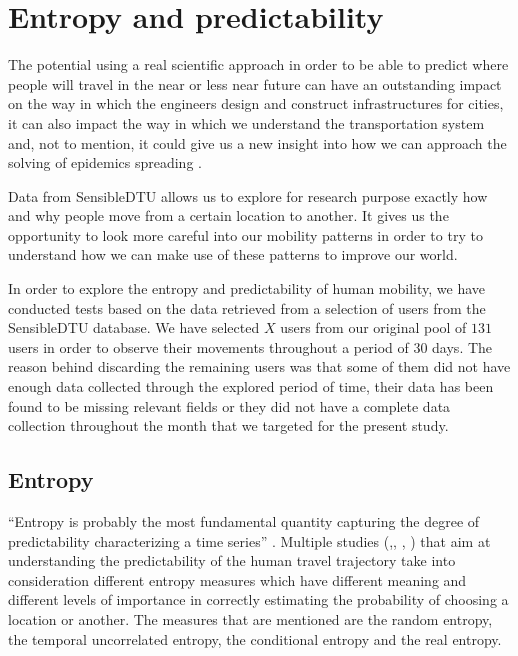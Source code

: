 \chapter{Entropy and predictability}

The potential using a real scientific approach in order to be able to predict
where people will travel in the near or less near future can have an outstanding
impact on the way in which the engineers design and construct infrastructures
for cities, it can also impact the way in which we understand the transportation
system and, not to mention, it could give us a new insight into how we can
approach the solving of epidemics spreading \cite{Lu13} \cite{Brockmann08}.

Data from SensibleDTU \cite{Stopczynski14m} allows us to explore for research
purpose exactly how and why people move from a certain location to another. It
gives us the opportunity to look more careful into our mobility patterns in
order to try to understand how we can make use of these patterns to improve our
world.

In order to explore the entropy and predictability of human mobility, we have
conducted tests based on the data retrieved from a selection of users from the
SensibleDTU database. We have selected $X$ users from our original pool of $131$
users in order to observe their movements throughout a period of $30$ days. The
reason behind discarding the remaining users was that some of them did not have
enough data collected through the explored period of time, their data has been
found to be missing relevant fields or they did not have a complete data
collection throughout the month that we targeted for the present study.

\section{Entropy}

``Entropy is probably the most fundamental quantity capturing the degree of
predictability characterizing a time series'' \cite{Barabasi10}. Multiple
studies (\cite{Sinatra14},\cite{Lu13}, \cite{marin2012exploring},
\cite{Barabasi10}) that aim at understanding the predictability of the human
travel trajectory take into consideration different entropy measures which have
different meaning and different levels of importance in correctly estimating the
probability of choosing a location or another. The measures that are mentioned
are the random entropy, the temporal uncorrelated entropy, the conditional
entropy and the real entropy.

